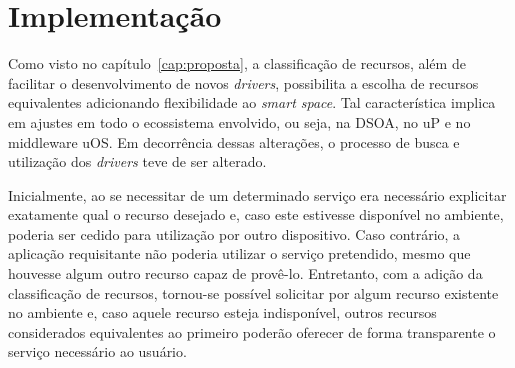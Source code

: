 \chapter{Implementação}

Como visto no capítulo~\ref{cap:proposta}, a classificação de recursos, além de facilitar o desenvolvimento de novos \emph{drivers}, possibilita a escolha de recursos equivalentes adicionando flexibilidade ao \emph{smart space}. Tal característica implica em ajustes em todo o ecossistema envolvido, ou seja, na DSOA, no uP e no middleware uOS. Em decorrência dessas alterações, o processo de busca e utilização dos \emph{drivers} teve de ser alterado.

Inicialmente, ao se necessitar de um determinado serviço era necessário explicitar exatamente qual o recurso desejado e, caso este estivesse disponível no ambiente, poderia ser cedido para utilização por outro dispositivo. Caso contrário, a aplicação requisitante não poderia utilizar o serviço pretendido, mesmo que houvesse algum outro recurso capaz de provê-lo. Entretanto, com a adição da classificação de recursos, tornou-se possível solicitar por algum recurso existente no ambiente e, caso aquele recurso esteja indisponível, outros recursos considerados equivalentes ao primeiro poderão oferecer de forma transparente o serviço necessário ao usuário.



